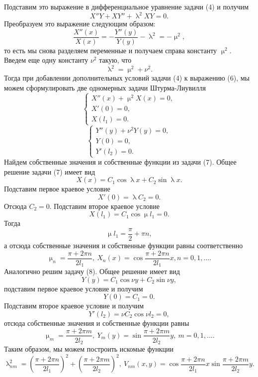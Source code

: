 \documentclass[a4paper, 12pt]{report}
\numberwithin{equation}{section}
\renewcommand{\lambda}{\uplambda}
\renewcommand{\mu}{\upmu}
\begin{document}
	Подставим это выражение в дифференциальное уравнение задачи (4) и получим
	$$X'' Y + X Y'' + \lambda ^2 XY = 0.$$
	Преобразуем это выражение следующим образом:
	\begin{equation}
		\dfrac{X''(x)}{X(x)} = - \dfrac{Y''(y)}{Y(y)} - \lambda^2 = - \mu^2,
	\end{equation}
	то есть мы снова разделяем переменные и получаем справа константу $\mu^2$.
	Введем еще одну константу $\nu ^2$ такую, что 
	$$\lambda^2 = \mu^2 + \nu^2.$$
	Тогда при добавлении дополнительных условий задачи (4) к выражению (6), мы можем сформулировать две одномерных задачи Штурма-Лиувилля 
	\begin{equation}
		\begin{cases}
			X''(x) + \mu^2 X(x) = 0,\\
			X'(0) = 0,\\
			X(l_1) = 0.
		\end{cases}
	\end{equation}
	\begin{equation}
		\begin{cases}
			Y''(y) + \nu^2 Y(y) = 0,\\
			Y(0) = 0,\\
			Y'(l_2) = 0.
		\end{cases}
	\end{equation}
	Найдем собственные значения и собственные функции из задачи (7). Общее решение задачи (7) имеет вид
	$$X(x) = C_1 \cos \lambda x + C_2 \sin \lambda x.$$
	Подставим первое краевое условие
	$$X'(0) = \lambda C_2  = 0.$$
	Отсюда $C_2 = 0$. Подставим второе краевое условие
	$$X(l_1) = C_1 \cos \mu l_1=0.$$
	Тогда 
	$$\mu l_1 = \dfrac{\pi}{2} + \pi n,$$
	а отсюда собственные значения и собственные функции равны соответственно
	\begin{equation}
		\mu_n = \dfrac{\pi + 2\pi n}{2l_1},\ X_n(x) = \cos \dfrac{\pi + 2\pi n}{2l_1}x, n=0,1,\ldots.
	\end{equation}
	Аналогично решим задачу (8). Общее решение имеет вид
	$$Y(y) = C_1 \cos \nu y + C_2 \sin \nu y,$$
	подставим первое краевое условие и получим
	$$Y(0) = C_1 = 0.$$
	Подставим второе краевое условие и получим
	$$Y'(l_2) = \nu C_2 \cos \nu l_2 =0,$$
	отсюда собственные значения и собственные функции равны
	\begin{equation}
		\mu_m = \dfrac{\pi + 2\pi m}{2l_2},\ Y_m(y) = \sin \dfrac{\pi + 2\pi m}{2l_2}y,\ m=0,1,\ldots.
	\end{equation}
	Таким образом, мы можем построить искомые функции
	\begin{equation}
		\lambda_{nm}^2 = \left(\dfrac{\pi + 2\pi n}{2l_1}\right)^2 + \left(\dfrac{\pi + 2\pi m}{2l_2}\right)^2, \ V_{nm}(x,y) = \cos \dfrac{\pi + 2\pi n}{2l_1}x\sin \dfrac{\pi + 2\pi m}{2l_2}y.
	\end{equation}
\end{document}
